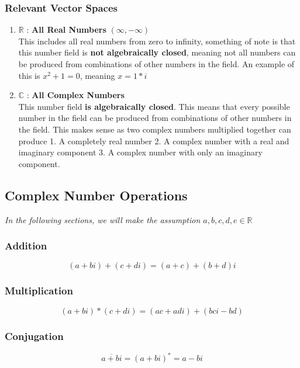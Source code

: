 \documentclass[12pt]{article}
\theoremstyle{plain}
\theoremstyle{nonumberplain}
\theoremstyle{plain}
\theoremstyle{nonumberplain}
\newcommand\1{{\bf 1}}
\newcommand{\R}{\mathbb{R}} %
\newcommand{\C}{\mathbb{C}} %
\newcommand{\<}{\left\langle}
\renewcommand{\>}{\right\rangle}
\begin{document}
\subsubsection{Relevant Vector Spaces}
\begin{enumerate}
	\item $\R$ : \textbf{All Real Numbers} $(\infty, -\infty)$ \\
	
	This includes all real numbers from zero to infinity, something of note is that this number field is \textbf{not algebraically closed}, meaning not all numbers can be produced from combinations of other numbers in the field.  An example of this is $x^2 + 1 = 0$, meaning $x = 1*i$
	
	\item $\C$ : \textbf{All Complex Numbers} \\
	
	This number field \textbf{is algebraically closed}.  This means that every possible number in the field can be produced from combinations of other numbers in the field.  This makes sense as two complex numbers multiplied together can produce 1. A completely real number 2. A complex number with a real and imaginary component 3. A complex number with only an imaginary component.
\end{enumerate}

\subsection{Complex Number Operations}
\textit{In the following sections, we will make the assumption $a, b, c, d, e \in \R$}
	\subsubsection{Addition}	
\begin{equation}
(a + bi) + (c + di) = (a+c) + (b+d)i 
\end{equation}

\subsubsection{Multiplication}	
\begin{equation}
(a+bi) * (c + di) = (ac+adi) + (bci-bd)
\end{equation}

\subsubsection{Conjugation}	
\begin{equation}
\overline{a + bi} = (a + bi)^* = a - bi
\end{equation}
\end{document}
